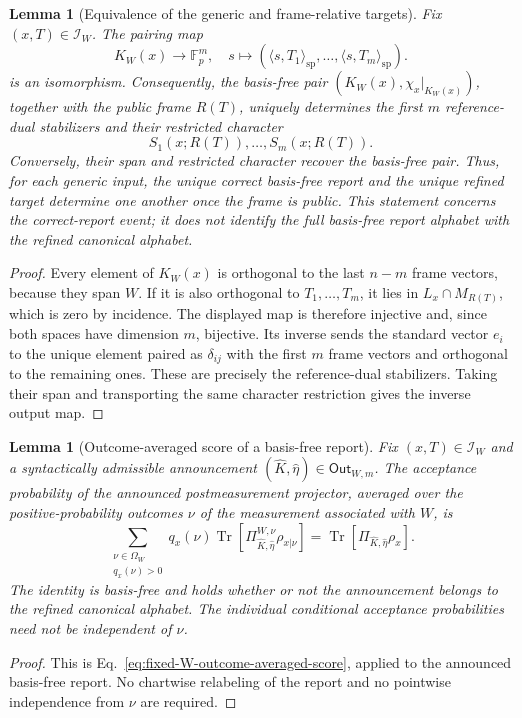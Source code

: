 \documentclass[11pt]{article}
\newcommand{\F}{\mathbb F}
\newcommand{\Tr}{\operatorname{Tr}}
\newcommand{\1}{\mathbf 1}
\newcommand{\spair}[2]{\langle #1,#2\rangle_{\mathrm{sp}}}
\theoremstyle{plain}
\newtheorem{lemma}[theorem]{Lemma}
\theoremstyle{definition}
\theoremstyle{remark}
\begin{document}
\begin{lemma}[Equivalence of the generic and frame-relative targets]
\label{lem:fixed-W-frame-target-equivalence}
Fix $(x,T)\in\mathcal I_W$.  The pairing map
\begin{equation}
 K_W(x)\longrightarrow\F_p^m,\quad
 s\longmapsto(\spair{s}{T_1},\ldots,\spair{s}{T_m}).
 \label{eq:fixed-W-pairing-isomorphism}
\end{equation}
is an isomorphism.  Consequently, the basis-free pair
$(K_W(x),\chi_x|_{K_W(x)})$, together with the public frame $R(T)$, uniquely
determines the first $m$ reference-dual stabilizers and their restricted character
\[
 S_1(x;R(T)),\ldots,S_m(x;R(T)).
\]  Conversely, their span
and restricted character recover the basis-free pair.  Thus, for each generic input, the unique correct basis-free report and
the unique refined target determine one another once the frame is public.
This statement concerns the correct-report event; it does not identify the
full basis-free report alphabet with the refined canonical alphabet.
\end{lemma}
\begin{proof}
Every element of $K_W(x)$ is orthogonal to the last $n-m$ frame vectors,
because they span $W$.  If it is also orthogonal to $T_1,\ldots,T_m$, it lies
in $L_x\cap M_{R(T)}$, which is zero by incidence.  The displayed map is
therefore injective and, since both spaces have dimension $m$, bijective.  Its
inverse sends the standard vector $e_i$ to the unique element paired as
$\delta_{ij}$ with the first $m$ frame vectors and orthogonal to the remaining
ones.  These are precisely the reference-dual stabilizers.  Taking their span
and transporting the same character restriction gives the inverse output
map.
\end{proof}

\begin{lemma}[Outcome-averaged score of a basis-free report]
\label{lem:fixed-W-frame-verification-score}
Fix $(x,T)\in\mathcal I_W$ and a syntactically admissible announcement
$(\widehat K,\widehat\eta)\in\mathsf{Out}_{W,m}$.  The acceptance probability
of the announced postmeasurement projector, averaged over the
positive-probability outcomes $\nu$ of the measurement associated with
$W$, is
\begin{equation}
 \sum_{\substack{\nu\in\Omega_W\\q_x(\nu)>0}}
 q_x(\nu)
 \Tr\!\left[
   \Pi_{\widehat K,\widehat\eta}^{W,\nu}
   \rho_{x|\nu}
 \right]
 =
 \Tr\!\left[
   \Pi_{\widehat K,\widehat\eta}\rho_x
 \right].
 \label{eq:fixed-W-frame-outcome-averaged-score}
\end{equation}
The identity is basis-free and holds whether or not the announcement belongs
to the refined canonical alphabet.  The individual conditional acceptance
probabilities need not be independent of $\nu$.
\end{lemma}
\begin{proof}
This is Eq.~\eqref{eq:fixed-W-outcome-averaged-score}, applied to the announced
basis-free report.  No chartwise relabeling of the report and no pointwise
independence from $\nu$ are required.
\end{proof}
\end{document}
